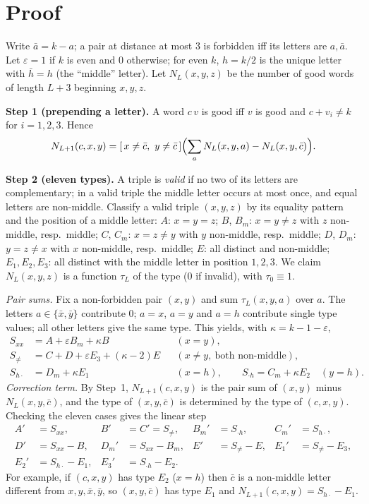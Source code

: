 \documentclass[11pt]{article}
\theoremstyle{remark}\newtheorem{remark}[theorem]{Remark}
\begin{document}
\section{Proof}
Write $\bar a=k-a$; a pair at distance at most $3$ is forbidden iff its letters are $a,\bar a$. Let $\varepsilon=1$ if $k$ is even and $0$ otherwise; for even $k$, $h=k/2$ is the unique letter with $\bar h=h$ (the ``middle'' letter). Let $N_L(x,y,z)$ be the number of good words of length $L+3$ beginning $x,y,z$.

\textbf{Step 1 (prepending a letter).} A word $c\,v$ is good iff $v$ is good and $c+v_i\ne k$ for $i=1,2,3$. Hence
\[N_{L+1}(c,x,y)=[\,x\ne\bar c,\ y\ne\bar c\,]\Bigl(\sum_a N_L(x,y,a)-N_L(x,y,\bar c)\Bigr).\]

\textbf{Step 2 (eleven types).} A triple is \emph{valid} if no two of its letters are complementary; in a valid triple the middle letter occurs at most once, and equal letters are non-middle. Classify a valid triple $(x,y,z)$ by its equality pattern and the position of a middle letter:
$A$: $x=y=z$; $B$, $B_m$: $x=y\ne z$ with $z$ non-middle, resp.\ middle; $C$, $C_m$: $x=z\ne y$ with $y$ non-middle, resp.\ middle; $D$, $D_m$: $y=z\ne x$ with $x$ non-middle, resp.\ middle; $E$: all distinct and non-middle; $E_1,E_2,E_3$: all distinct with the middle letter in position $1,2,3$. We claim $N_L(x,y,z)$ is a function $\tau_L$ of the type ($0$ if invalid), with $\tau_0\equiv1$.

\emph{Pair sums.} Fix a non-forbidden pair $(x,y)$ and sum $\tau_L(x,y,a)$ over $a$. The letters $a\in\{\bar x,\bar y\}$ contribute $0$; $a=x$, $a=y$ and $a=h$ contribute single type values; all other letters give the same type. This yields, with $\kappa=k-1-\varepsilon$,
\begin{align*}
S_{xx}&=A+\varepsilon B_m+\kappa B &&(x=y),\\
S_{\neq}&=C+D+\varepsilon E_3+(\kappa-2)E &&(x\ne y,\ \text{both non-middle}),\\
S_{h\cdot}&=D_m+\kappa E_1 &&(x=h),\qquad S_{\cdot h}=C_m+\kappa E_2\quad(y=h).
\end{align*}
\emph{Correction term.} By Step~1, $N_{L+1}(c,x,y)$ is the pair sum of $(x,y)$ minus $N_L(x,y,\bar c)$, and the type of $(x,y,\bar c)$ is determined by the type of $(c,x,y)$. Checking the eleven cases gives the linear step
\begin{align*}
A'&=S_{xx}, & B'&=C'=S_{\neq}, & B_m'&=S_{\cdot h}, & C_m'&=S_{h\cdot},\\
D'&=S_{xx}-B, & D_m'&=S_{xx}-B_m, & E'&=S_{\neq}-E, & E_1'&=S_{\neq}-E_3,\\
E_2'&=S_{h\cdot}-E_1, & E_3'&=S_{\cdot h}-E_2.
\end{align*}
For example, if $(c,x,y)$ has type $E_2$ ($x=h$) then $\bar c$ is a non-middle letter different from $x,y,\bar x,\bar y$, so $(x,y,\bar c)$ has type $E_1$ and $N_{L+1}(c,x,y)=S_{h\cdot}-E_1$.
\end{document}
